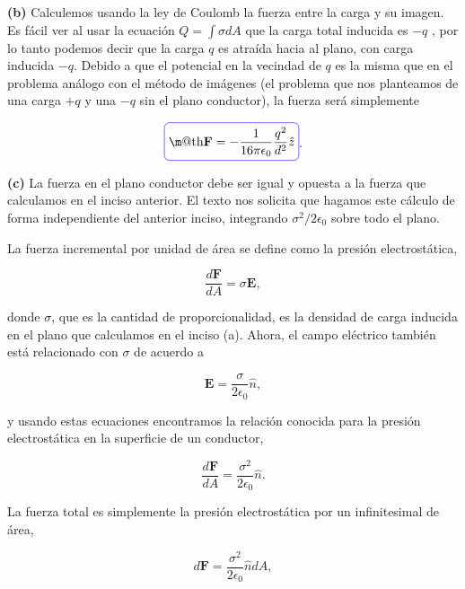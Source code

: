 \documentclass[a4paper,11pt]{article}
\makeatletter
\numberwithin{equation}{section}
\newcommand*{\boxcolor}{blue}
\renewcommand{\boxed}[1]{\textcolor{\boxcolor}{%
\tikz[baseline={([yshift=-1ex]current bounding box.center)}] \node [rectangle, minimum width=1ex,rounded corners,draw] {\normalcolor\m@th$\displaystyle#1$};}}
\makeatother
\begin{document}
\textbf{(b)} Calculemos usando la ley de Coulomb la fuerza entre la  carga y 
su imagen. Es fácil ver al usar la ecuación $Q = \int \sigma dA$ 
que la carga total inducida es $-q$ \cite{griffiths}, por lo tanto podemos decir que la carga $q$ 
es atraída hacia al plano, con carga inducida $-q$. Debido a que el potencial
en la vecindad de $q$ es la misma que en el problema análogo con el método de 
imágenes (el problema que nos planteamos de una carga $+q$ y una $-q$ sin el plano 
conductor), la fuerza será simplemente 

\begin{equation}
 \boxed{\mathbf{F} = - \frac{1}{16\pi\epsilon_0}\frac{q^2}{d^2}\hat{z}}.
\end{equation}

\textbf{(c)} La fuerza en el plano conductor debe ser igual y opuesta a la fuerza 
que calculamos en el inciso anterior. El texto nos solicita que hagamos este cálculo 
de forma independiente del anterior inciso, integrando $\sigma^2/2\epsilon_0$ sobre 
todo el plano. 

\vspace{.3cm}

La fuerza incremental por unidad de área se define como la presión electrostática, 

\begin{equation}
 \frac{d\mathbf{F}}{dA} = \sigma\mathbf{E},
\end{equation}

donde $\sigma$, que es la cantidad de proporcionalidad, es la densidad de carga 
inducida en el plano que calculamos en el inciso (a). Ahora, el campo eléctrico 
también está relacionado con $\sigma$ de acuerdo a 

\begin{equation}
 \mathbf{E} = \frac{\sigma}{2\epsilon_0}\hat{n},
\end{equation}

y usando estas ecuaciones encontramos la relación conocida para la presión electrostática 
en la superficie de un conductor, 

\begin{equation}
  \frac{d\mathbf{F}}{dA} = \frac{\sigma^2}{2\epsilon_0}\hat{n}.
\end{equation}

La fuerza total es simplemente la presión electrostática por un infinitesimal de 
área, 

\begin{equation}
 d\mathbf{F} = \frac{\sigma^2}{2\epsilon_0}\hat{n}dA,
\end{equation}
\end{document}
